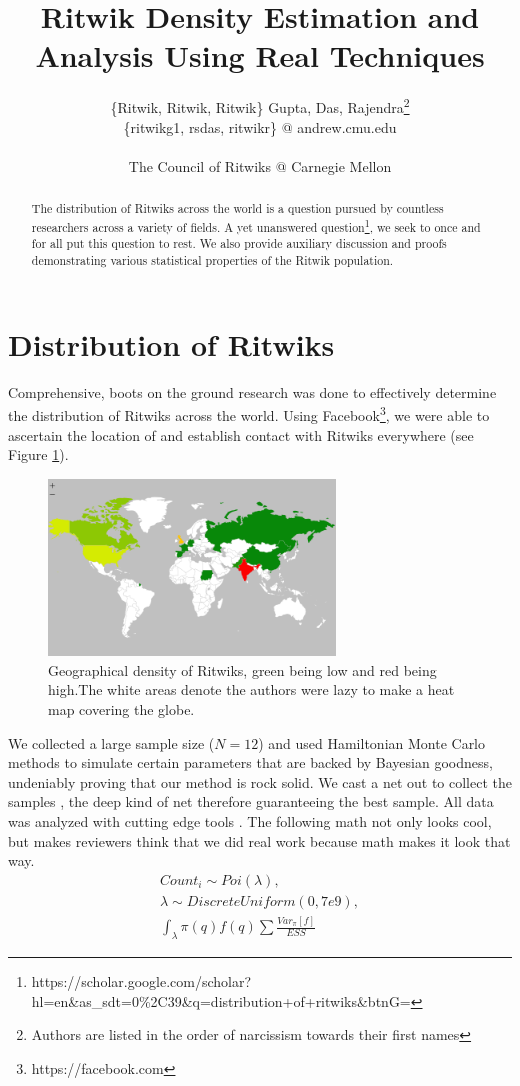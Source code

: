 \documentclass[]{article}
\title{Ritwik Density Estimation and Analysis Using Real Techniques}
\author{\{Ritwik, Ritwik, Ritwik\} Gupta, Das, Rajendra\footnote{Authors are listed in the order of narcissism towards their first names}
	\\
	\{ritwikg1, rsdas, ritwikr\} @ andrew.cmu.edu
	\\
	\\
	The Council of Ritwiks @ Carnegie Mellon}
\date{}
\begin{document}
\maketitle

\begin{abstract}
The distribution of Ritwiks across the world is a question pursued by countless researchers across a variety of fields. A yet unanswered question\footnote{https://scholar.google.com/scholar?hl=en\&as\_sdt=0\%2C39\&q=distribution+of+ritwiks\&btnG=}, we seek to once and for all put this question to rest. We also provide auxiliary discussion and proofs demonstrating various statistical properties of the Ritwik population.
\end{abstract}

\section{Distribution of Ritwiks}
Comprehensive, boots on the ground research was done to effectively determine the distribution of Ritwiks across the world. Using Facebook\footnote{https://facebook.com}, we were able to ascertain the location of and establish contact with Ritwiks everywhere (see Figure \ref{fig:ritwikgeographicaldistro}).
\begin{figure}[h]
	\centering
	\includegraphics[width=3in]{figures/RitwikGeographicalDistro}
	\caption{Geographical density of Ritwiks, green being low and red being high.The white areas denote the authors were lazy to make a heat map covering the globe.}
	\label{fig:ritwikgeographicaldistro}
\end{figure}
We collected a large sample size ($N = 12$) and used Hamiltonian Monte Carlo methods to simulate certain parameters that are backed by Bayesian goodness, undeniably proving that our method is rock solid. We cast a net out to collect the samples , the deep kind of net therefore guaranteeing the best sample. All data was analyzed with cutting edge tools \cite{Zaharia:2012:RDD:2228298.2228301, PyMC3}. The following math not only looks cool, but makes reviewers think that we did real work because math makes it look that way.
\begin{subequations}
\begin{align}
Count_i \sim Poi(\lambda),\\
\lambda \sim DiscreteUniform(0, 7e9),\\
\int_{\lambda}\pi(q)f(q)\sum{\frac{Var_\pi[f]}{ESS}}
\end{align}
\end{subequations}
\vspace{1in}
\end{document}
